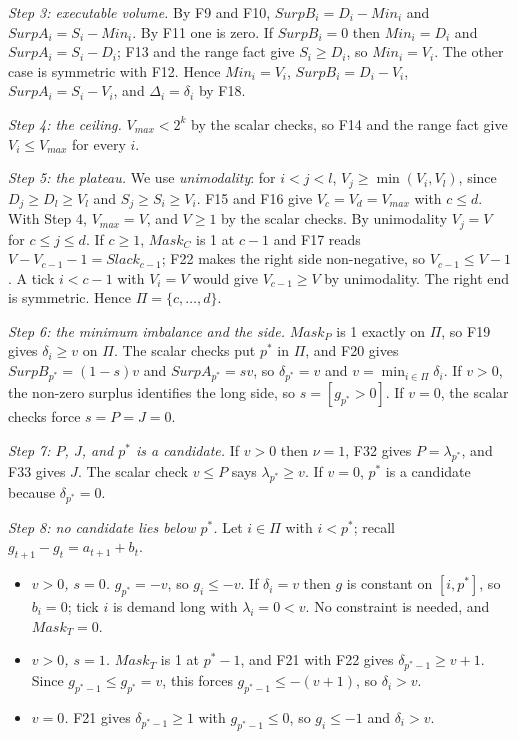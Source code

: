 \emph{Step 3: executable volume.} By F9 and F10, \(SurpB_i = D_i - Min_i\) and \(SurpA_i = S_i - Min_i\). By F11 one is zero. If \(SurpB_i = 0\) then \(Min_i = D_i\) and \(SurpA_i = S_i - D_i\); F13 and the range fact give \(S_i \ge D_i\), so \(Min_i = V_i\). The other case is symmetric with F12. Hence \(Min_i = V_i\), \(SurpB_i = D_i - V_i\), \(SurpA_i = S_i - V_i\), and \(\Delta_i = \delta_i\) by F18.

\emph{Step 4: the ceiling.} \(V_{max} < 2^k\) by the scalar checks, so F14 and the range fact give \(V_i \le V_{max}\) for every \(i\).

\emph{Step 5: the plateau.} We use \emph{unimodality}: for \(i < j < l\), \(V_j \ge \min(V_i, V_l)\), since \(D_j \ge D_l \ge V_l\) and \(S_j \ge S_i \ge V_i\). F15 and F16 give \(V_c = V_d = V_{max}\) with \(c \le d\). With Step 4, \(V_{max} = V\), and \(V \ge 1\) by the scalar checks. By unimodality \(V_j = V\) for \(c \le j \le d\). If \(c \ge 1\), \(Mask_C\) is 1 at \(c - 1\) and F17 reads \(V - V_{c-1} - 1 = Slack_{c-1}\); F22 makes the right side non-negative, so \(V_{c-1} \le V - 1\). A tick \(i < c-1\) with \(V_i = V\) would give \(V_{c-1} \ge V\) by unimodality. The right end is symmetric. Hence \(\Pi = \{c, \ldots, d\}\).

\emph{Step 6: the minimum imbalance and the side.} \(Mask_P\) is 1 exactly on \(\Pi\), so F19 gives \(\delta_i \ge v\) on \(\Pi\). The scalar checks put \(p^*\) in \(\Pi\), and F20 gives \(SurpB_{p^*} = (1-s)v\) and \(SurpA_{p^*} = sv\), so \(\delta_{p^*} = v\) and \(v = \min_{i \in \Pi} \delta_i\). If \(v > 0\), the non-zero surplus identifies the long side, so \(s = [g_{p^*} > 0]\). If \(v = 0\), the scalar checks force \(s = P = J = 0\).

\emph{Step 7: \(P\), \(J\), and \(p^*\) is a candidate.} If \(v > 0\) then \(\nu = 1\), F32 gives \(P = \lambda_{p^*}\), and F33 gives \(J\). The scalar check \(v \le P\) says \(\lambda_{p^*} \ge v\). If \(v = 0\), \(p^*\) is a candidate because \(\delta_{p^*} = 0\).

\emph{Step 8: no candidate lies below \(p^*\).} Let \(i \in \Pi\) with \(i < p^*\); recall \(g_{t+1} - g_t = a_{t+1} + b_t\).

\begin{itemize}
\item
  \emph{\(v > 0\), \(s = 0\).} \(g_{p^*} = -v\), so \(g_i \le -v\). If \(\delta_i = v\) then \(g\) is constant on \([i, p^*]\), so \(b_i = 0\); tick \(i\) is demand long with \(\lambda_i = 0 < v\). No constraint is needed, and \(Mask_T = 0\).
\item
  \emph{\(v > 0\), \(s = 1\).} \(Mask_T\) is 1 at \(p^* - 1\), and F21 with F22 gives \(\delta_{p^*-1} \ge v + 1\). Since \(g_{p^*-1} \le g_{p^*} = v\), this forces \(g_{p^*-1} \le -(v+1)\), so \(\delta_i > v\).
\item
  \emph{\(v = 0\).} F21 gives \(\delta_{p^*-1} \ge 1\) with \(g_{p^*-1} \le 0\), so \(g_i \le -1\) and \(\delta_i > v\).
\end{itemize}


